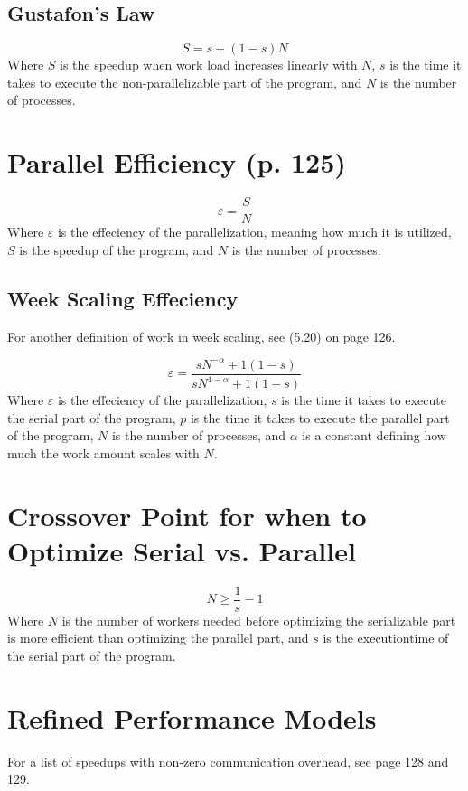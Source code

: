 \documentclass{article}
\begin{document}
		\subsection{Gustafon's Law}
			\begin{equation}
				S=s+(1-s)N
			\end{equation}
			Where $S$ is the speedup when work load increases linearly with $N$, $s$ is the time it takes to execute the non-parallelizable part of the program, and $N$ is the number of processes.
	
	\section{Parallel Efficiency (p. 125)}
		\begin{equation}
			\varepsilon=\frac{S}{N}
		\end{equation}
		Where $\varepsilon$ is the effeciency of the parallelization, meaning how much it is utilized, $S$ is the speedup of the program, and $N$ is the number of processes.

		\subsection{Week Scaling Effeciency}
			For another definition of work in week scaling, see (5.20) on page 126.

			\begin{equation}
				\varepsilon=\frac{sN^{-\alpha}+1(1-s)}{sN^{1-\alpha}+1(1-s)}
			\end{equation}
			Where $\varepsilon$ is the effeciency of the parallelization, $s$ is the time it takes to execute the serial part of the program, $p$ is the time it takes to execute the parallel part of the program, $N$ is the number of processes, and $\alpha$ is a constant defining how much the work amount scales with $N$.
	
	\section{Crossover Point for when to Optimize Serial vs. Parallel}
			\begin{equation}
				N\geq\frac{1}{s}-1
			\end{equation}
			Where $N$ is the number of workers needed before optimizing the serializable part is more efficient than optimizing the parallel part, and $s$ is the executiontime of the serial part of the program.
	
	\section{Refined Performance Models}
		For a list of speedups with non-zero communication overhead, see page 128 and 129.
	
\end{document}
